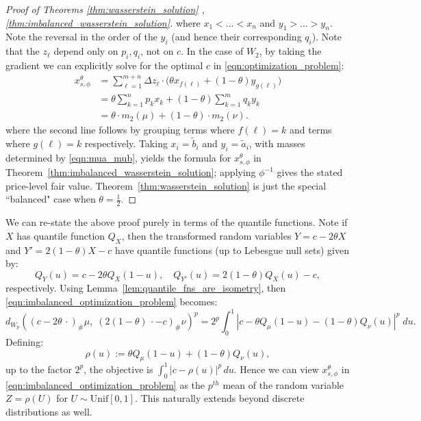 \documentclass[11pt]{article}
\theoremstyle{plain}
\theoremstyle{definition}
\numberwithin{equation}{section}
\begin{document}
\begin{proof}[Proof of Theorems \ref{thm:wasserstein_solution} ,\ref{thm:imbalanced_wasserstein_solution}]
\noindent where $x_1 < ... < x_n$ and $y_1 > ... > y_n$. Note the reversal in the order of the $y_i$ (and hence their corresponding $q_i$). Note that the $z_\ell$ depend only on $p_i, q_i$, not on $c$. In the case of $W_2$, by taking the gradient we can explicitly solve for the optimal $c$ in \eqref{eqn:optimization_problem}:
%
\begin{align*}
    x_{s,\phi}^\theta & = \sum_{\ell = 1}^{m+n} \Delta z_\ell \cdot \Big( \theta x_{f(\ell)} + (1-\theta)y_{g(\ell)} \Big) \\
    & =  \theta \sum_{k=1}^n p_k x_k +  (1-\theta)\sum_{k=1}^m q_ky_k \\
    & = \theta \cdot m_2(\mu) + (1-\theta) \cdot m_2(\nu).
\end{align*}
%
\noindent where the second line follows by grouping terms where $f(\ell) = k$ and
terms where $g(\ell) = k$ respectively. Taking $x_i=\widetilde b_i$ and $y_i=\widetilde a_i$, with masses determined by \eqref{eqn:mua_mub}, yields the formula for $x_{s,\phi}^\theta$ in Theorem~\ref{thm:imbalanced_wasserstein_solution}; applying $\phi^{-1}$ gives the stated price-level fair value.
Theorem~\ref{thm:wasserstein_solution} is just the special ``balanced" case when $\theta = \frac{1}{2}$.
\end{proof}

We can re-state the above proof purely in terms of the quantile functions. Note if $X$ has
quantile function $Q_X$, then the transformed random variables $Y = c-2\theta X$ and $Y' = 2(1-\theta)X - c$ have
quantile functions (up to Lebesgue null sets) given by:
%
    \[Q_Y(u) = c-2\theta Q_X(1-u), \quad Q_{Y'}(u) = 2(1-\theta) Q_X(u) - c,\]
%
\noindent respectively. Using Lemma~\ref{lem:quantile_fns_are_isometry}, then \eqref{eqn:imbalanced_optimization_problem} becomes:
%
\[d_{W_p}\left((c-2\theta\,\cdot)_\#\mu, \; (2(1-\theta)\,\cdot-c)_\#\nu\right)^p = 2^p \int_0^1 \left|c - \theta Q_\mu(1-u) - (1-\theta) Q_\nu(u)\right|^p \; du.\]
%
\noindent Defining:
%
\[\rho(u) := \theta Q_\mu(1-u) + (1-\theta) Q_\nu(u),\]
%
\noindent up to the factor $2^p$, the objective is $\int_0^1 |c-\rho(u)|^p\,du$. Hence we can
view $x_{s,\phi}^\theta$ in \eqref{eqn:imbalanced_optimization_problem} as the $p^{th}$ mean of the
random variable $Z = \rho(U)$ for $U \sim \mathrm{Unif}[0,1]$. This naturally extends
beyond discrete distributions as well.
\end{document}
